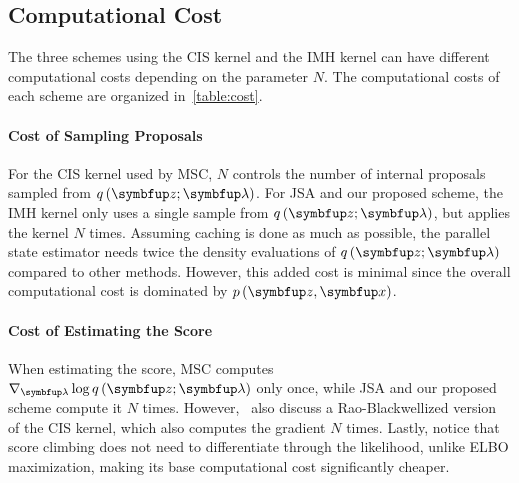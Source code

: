 \begin{wraptable}{r}{0.6\textwidth}
  \vspace{-0.75in}
  
  \vspace{-0.2in}
\end{wraptable}
%
\subsection{Computational Cost}
The three schemes using the CIS kernel and the IMH kernel can have different computational costs depending on the parameter \(N\).
The computational costs of each scheme are organized in~\cref{table:cost}.

\vspace{-0.05in}
\paragraph{Cost of Sampling Proposals}
For the CIS kernel used by MSC, \(N\) controls the number of internal proposals sampled from \(q\,(\vz; \vlambda)\).
For JSA and our proposed scheme, the IMH kernel only uses a single sample from \(q\,(\vz; \vlambda)\), but applies the kernel \(N\) times.
Assuming caching is done as much as possible, the parallel state estimator needs twice the density evaluations of \(q\,(\vz; \vlambda)\) compared to other methods.
However, this added cost is minimal since the overall computational cost is dominated by  \(p\,(\vz,\vx)\).

\vspace{-0.05in}
\paragraph{Cost of Estimating the Score}
When estimating the score, MSC computes \(\nabla_{\vlambda} \log q\,(\vz; \vlambda)\) only once, while JSA and our proposed scheme compute it \(N\) times.
However,~\cite{NEURIPS2020_b2070693} also discuss a Rao-Blackwellized version of the CIS kernel, which also computes the gradient \(N\) times.
Lastly, notice that score climbing does not need to differentiate through the likelihood, unlike ELBO maximization, making its base computational cost significantly cheaper.

